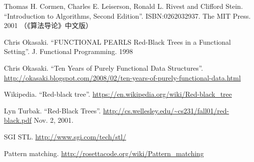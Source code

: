 \documentclass[b5paper]{ctexart}
\begin{document}
\begin{thebibliography}{99}

Thomas H. Cormen, Charles E. Leiserson, Ronald L. Rivest and Clifford Stein.
``Introduction to Algorithms, Second Edition''. ISBN:0262032937. The MIT Press. 2001 （《算法导论》中文版）

Chris Okasaki. ``FUNCTIONAL PEARLS Red-Black Trees in a Functional Setting''. J. Functional Programming. 1998

Chris Okasaki. ``Ten Years of Purely Functional Data Structures''. \url{http://okasaki.blogspot.com/2008/02/ten-years-of-purely-functional-data.html}

Wikipedia. ``Red-black tree''. \url{https://en.wikipedia.org/wiki/Red-black_tree}

Lyn Turbak. ``Red-Black Trees''. \url{http://cs.wellesley.edu/~cs231/fall01/red-black.pdf} Nov. 2, 2001.

SGI STL. \url{http://www.sgi.com/tech/stl/}

Pattern matching. \url{http://rosettacode.org/wiki/Pattern_matching}

\end{thebibliography}

\expandafter\enddocument

\fi
\end{document}
